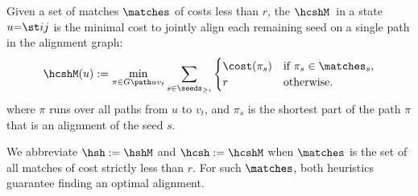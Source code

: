 \begin{definition}[\Csh]
  Given a set of matches $\matches$ of costs less than $r$, the \emph{\csh} $\hcshM$\,
  in a state $u{=}\st ij$ is the minimal cost to jointly align each remaining
  seed on a single path in the alignment graph:
  \begin{equation}
    \hcshM(u) := \min_{\pi \in G \path u{v_t}}  \sum_{s\in \seeds_{\geq i}}
    \begin{cases}
    \cost(\pi_s) &\text{if $\pi_s \in \matches_s$}, \\
    r &\text{otherwise.}
    \end{cases}
    \label{GLOBALeq:csh}
  \end{equation}
  where $\pi$ runs over all paths from $u$ to $v_t$, and $\pi_s$ is the shortest
  part of the path $\pi$ that is an alignment of the seed $s$.
\end{definition}

We abbreviate $\hsh := \hshM$ and $\hcsh := \hcshM$ when $\matches$ is the set of all
matches of cost strictly less than $r$. For such $\matches$, both heuristics guarantee
finding an optimal alignment.

